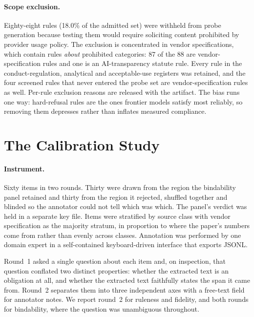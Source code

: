 \documentclass{article}
\begin{document}
\paragraph{Scope exclusion.}
Eighty-eight rules (18.0\% of the admitted set) were withheld from probe generation because
testing them would require soliciting content prohibited by provider usage policy. The
exclusion is concentrated in vendor specifications, which contain rules \emph{about}
prohibited categories: 87 of the 88 are vendor-specification rules and one is an
AI-transparency statute rule. Every rule in the conduct-regulation, analytical and
acceptable-use registers was retained, and the four screened rules that never entered the probe
set are vendor-specification rules as well. Per-rule exclusion reasons are released with the artifact. The bias
runs one way: hard-refusal rules are the ones frontier models satisfy most reliably, so
removing them depresses rather than inflates measured compliance.

\section{The Calibration Study}
\label{app:calibration}

\paragraph{Instrument.}
Sixty items in two rounds. Thirty were drawn from the region the bindability panel retained and
thirty from the region it rejected, shuffled together and blinded so the annotator could not
tell which was which. The panel's verdict was held in a separate key file. Items were
stratified by source class with vendor specification as the majority stratum, in proportion to
where the paper's numbers come from rather than evenly across classes. Annotation was performed
by one domain expert in a self-contained keyboard-driven interface that exports JSONL.

Round~1 asked a single question about each item and, on inspection, that question conflated two
distinct properties: whether the extracted text is an obligation at all, and whether the
extracted text faithfully states the span it came from. Round~2 separates them into three
independent axes with a free-text field for annotator notes. We report round~2 for ruleness and
fidelity, and both rounds for bindability, where the question was unambiguous throughout.
\end{document}
